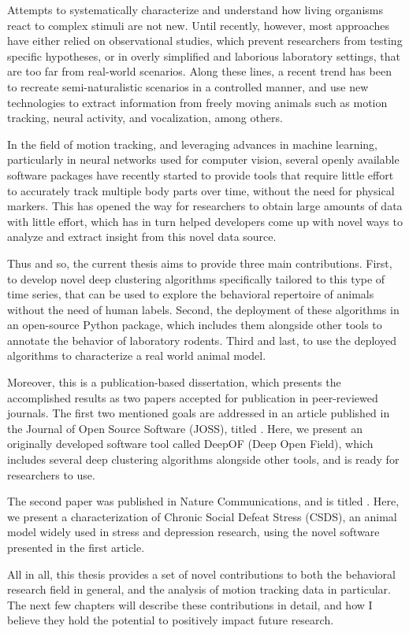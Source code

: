 Attempts to systematically characterize and understand how living organisms react to complex stimuli are not new. Until recently, however, most approaches have either relied on observational studies, which prevent researchers from testing specific hypotheses, or in overly simplified and laborious laboratory settings, that are too far from real-world scenarios. Along these lines, a recent trend has been to recreate semi-naturalistic scenarios in a controlled manner, and use new technologies to extract information from freely moving animals such as motion tracking, neural activity, and vocalization, among others.

In the field of motion tracking, and leveraging advances in machine learning, particularly in neural networks used for computer vision, several openly available software packages have recently started to provide tools that require little effort to accurately track multiple body parts over time, without the need for physical markers. This has opened the way for researchers to obtain large amounts of data with little effort, which has in turn helped developers come up with novel ways to analyze and extract insight from this novel data source.

Thus and so, the current thesis aims to provide three main contributions. First, to develop novel deep clustering algorithms specifically tailored to this type of time series, that can be used to explore the behavioral repertoire of animals without the need of human labels. Second, the deployment of these algorithms in an open-source Python package, which includes them alongside other tools to annotate the behavior of laboratory rodents. Third and last, to use the deployed algorithms to characterize a real world animal model.

Moreover, this is a publication-based dissertation, which presents the accomplished results as two papers accepted for publication in peer-reviewed journals. The first two mentioned goals are addressed in an article published in the Journal of Open Source Software (JOSS), titled \josstitle. Here, we present an originally developed software tool called DeepOF (Deep Open Field), which includes several deep clustering algorithms alongside other tools, and is ready for researchers to use. 

The second paper was published in Nature Communications, and is titled \natcommtitle. Here, we present a characterization of Chronic Social Defeat Stress (CSDS), an animal model widely used in stress and depression research, using the novel software presented in the first article.

All in all, this thesis provides a set of novel contributions to both the behavioral research field in general, and the analysis of motion tracking data in particular. The next few chapters will describe these contributions in detail, and how I believe they hold the potential to positively impact future research.
